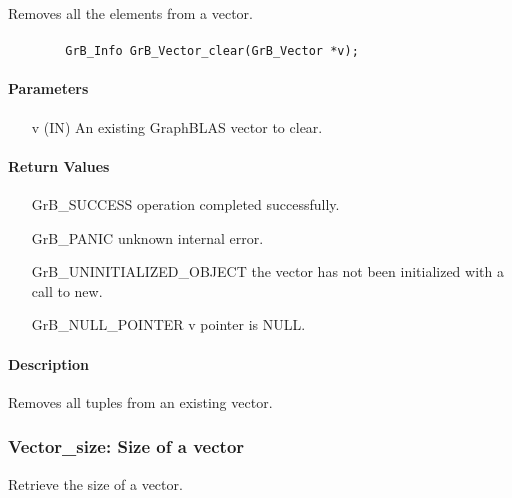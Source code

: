 Removes all the elements from a vector.

\paragraph{\syntax}

\begin{verbatim}
        GrB_Info GrB_Vector_clear(GrB_Vector *v);
\end{verbatim}

\paragraph{Parameters}

\begin{itemize}[leftmargin=1.1in]
    \item[{\sf v}] ({\sf IN}) An existing GraphBLAS vector to clear.
\end{itemize}

\paragraph{Return Values}

\begin{itemize}[leftmargin=2.1in]
\item[{\sf GrB\_SUCCESS}]   operation completed successfully.
\item[{\sf GrB\_PANIC}]     unknown internal error.
\item[{\sf GrB\_UNINITIALIZED\_OBJECT}]  the vector has not been initialized with a call to new.
\item[{\sf GrB\_NULL\_POINTER}]    {\sf v} pointer is {\sf NULL}.
\end{itemize}

\paragraph{Description}

Removes all tuples from an existing vector.

\subsubsection{{\sf Vector\_size}: Size of a vector}

Retrieve the size of a vector.

\paragraph{\syntax}

